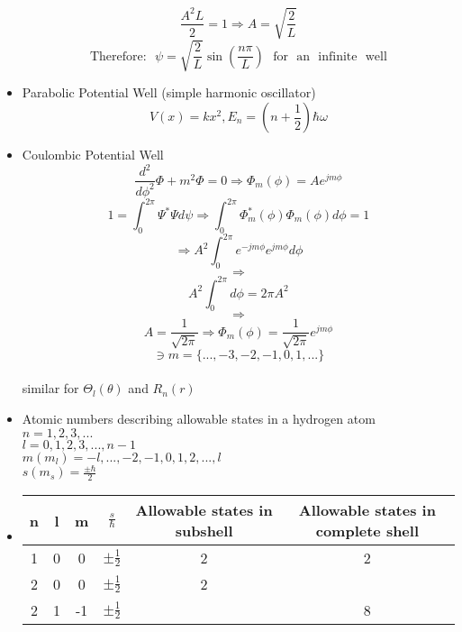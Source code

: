 \documentclass{article}
\begin{document}
\begin{itemize}
\begin{equation}
    \frac{A^2L}{2}=1\Rightarrow A=\sqrt{\frac{2}{L}}
  \end{equation}
  \begin{equation}
    \text{Therefore:~ }\psi=\sqrt{\frac{2}{L}}\sin(\frac{n\pi}{L})\text{ ~for~ an~ infinite~ well}
  \end{equation}
\item Parabolic Potential Well (simple harmonic oscillator)
  \begin{equation}
    V(x)=kx^2, E_n=(n+\frac{1}{2})\hbar\omega
  \end{equation}
\item Coulombic Potential Well
  \begin{equation}
    \frac{d^2}{d\phi^2}\Phi+m^2\Phi=0\Rightarrow\Phi_m(\phi)=Ae^{jm\phi}
  \end{equation}
  \begin{equation}
    1=\int_0^{2\pi}\Psi^*\Psi d\psi\Rightarrow\int_0^{2\pi}\Phi_m^*(\phi)\Phi_m(\phi)d\phi=1
  \end{equation}  \begin{equation}
    \Rightarrow A^2\int_0^{2\pi}e^{-jm\phi}e^{jm\phi}d\phi
  \end{equation}
  $$\Rightarrow$$
  \begin{equation}A^2\int_0^{2\pi}d\phi=2\pi A^2
  \end{equation}$$\Rightarrow$$
  \begin{equation}A=\frac{1}{\sqrt{2\pi}}\Rightarrow \Phi_m(\phi)=\frac{1}{\sqrt{2\pi}}e^{jm\phi}
  \end{equation}$$\ni m=\{...,-3,-2,-1,0,1,...\}$$\\
  similar for $\Theta_{l}(\theta)$ and $R_n(r)$
\item Atomic numbers describing allowable states in a hydrogen atom\\
  $n = 1,2,3,...$\\$l=0,1,2,3,...,n-1$\\$m (m_l) = -l,...,-2,-1,0,1,2,...,l$\\$s (m_s) = \frac{\pm\hbar}{2}$\\
\item \begin{tabular}{c|c|c|c|c|c}
  n & l & m & $\frac{s}{\hbar}$& Allowable states in subshell & Allowable states in complete shell \\
  \hline
  1 & 0 & 0 & $\pm\frac{1}{2}$ & 2 & 2 \\
  2 & 0 & 0 & $\pm\frac{1}{2}$ & 2 &   \\
  2 & 1 & -1 & $\pm\frac{1}{2}$ &   & 8 \\

\end{tabular}
\end{itemize}
\end{document}
